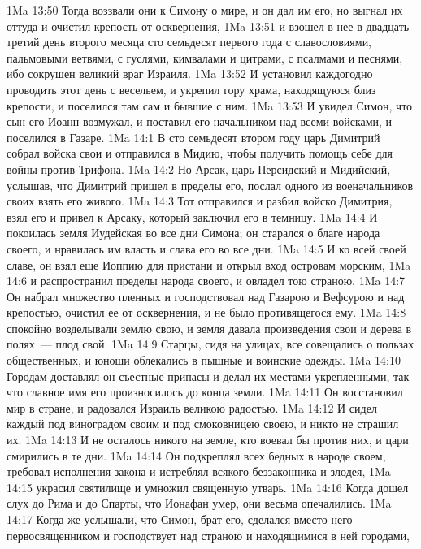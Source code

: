 \vs 1Ma 13:50 Тогда воззвали они к Симону о мире, и он дал им его, но выгнал их оттуда и очистил крепость от осквернения,
\vs 1Ma 13:51 и взошел в нее в двадцать третий день второго месяца сто семьдесят первого года с славословиями, пальмовыми ветвями, с гуслями, кимвалами и цитрами, с псалмами и песнями, ибо сокрушен великий враг Израиля.
\vs 1Ma 13:52 И установил каждогодно проводить этот день с весельем, и укрепил гору храма, находящуюся близ крепости, и поселился там сам и бывшие с ним.
\vs 1Ma 13:53 И увидел Симон, что сын его Иоанн возмужал, и поставил его начальником над всеми войсками, и поселился в Газаре.
\vs 1Ma 14:1 В сто семьдесят втором году царь Димитрий собрал войска свои и отправился в Мидию, чтобы получить помощь себе для войны против Трифона.
\vs 1Ma 14:2 Но Арсак, царь Персидский и Мидийский, услышав, что Димитрий пришел в пределы его, послал одного из военачальников своих взять его живого.
\vs 1Ma 14:3 Тот отправился и разбил войско Димитрия, взял его и привел к Арсаку, который заключил его в темницу.
\rsbpar\vs 1Ma 14:4 И покоилась земля Иудейская во все дни Симона; он старался о благе народа своего, и нравилась им власть и слава его во все дни.
\vs 1Ma 14:5 И ко всей своей славе, он взял еще Иоппию для пристани и открыл вход островам морским,
\vs 1Ma 14:6 и распространил пределы народа своего, и овладел тою страною.
\vs 1Ma 14:7 Он набрал множество пленных и господствовал над Газарою и Вефсурою и над крепостью, очистил ее от осквернения, и не было противящегося ему.
\vs 1Ma 14:8  спокойно возделывали землю свою, и земля давала произведения свои и дерева в полях~--- плод свой.
\vs 1Ma 14:9 Старцы, сидя на улицах, все совещались о пользах общественных, и юноши облекались в пышные и воинские одежды.
\vs 1Ma 14:10 Городам доставлял он съестные припасы и делал их местами укрепленными, так что славное имя его произносилось до конца земли.
\vs 1Ma 14:11 Он восстановил мир в стране, и радовался Израиль великою радостью.
\vs 1Ma 14:12 И сидел каждый под виноградом своим и под смоковницею своею, и никто не страшил их.
\vs 1Ma 14:13 И не осталось никого на земле, кто воевал бы против них, и цари смирились в те дни.
\vs 1Ma 14:14 Он подкреплял всех бедных в народе своем, требовал исполнения закона и истреблял всякого беззаконника и злодея,
\vs 1Ma 14:15 украсил святилище и умножил священную утварь.
\rsbpar\vs 1Ma 14:16 Когда дошел слух до Рима и до Спарты, что Ионафан умер, они весьма опечалились.
\vs 1Ma 14:17 Когда же услышали, что Симон, брат его, сделался вместо него первосвященником и господствует над страною и находящимися в ней городами,
